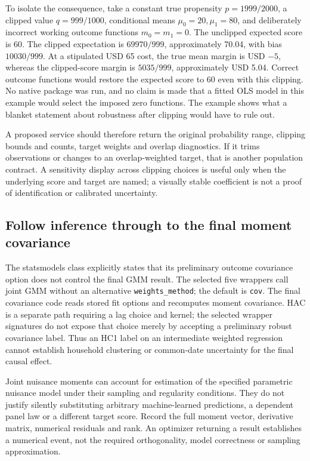 To isolate the consequence, take a constant true propensity
$p=1999/2000$, a clipped value $q=999/1000$, conditional means
$\mu_0=20,\mu_1=80$, and deliberately incorrect working outcome functions
$m_0=m_1=0$. The unclipped expected score is 60. The clipped expectation
is $69970/999$, approximately 70.04, with bias $10030/999$.
At a stipulated USD 65 cost, the true mean margin is USD $-5$, whereas
the clipped-score margin is $5035/999$, approximately USD 5.04. Correct
outcome functions would restore the expected score to 60 even with this
clipping. No native package was run, and no claim is made that a fitted
OLS model in this example would select the imposed zero functions.
The example shows what a blanket statement about robustness after clipping
would have to rule out.~\citep{exec20_python_effect_reference}

A proposed service should therefore return the original probability range,
clipping bounds and counts, target weights and overlap diagnostics. If it
trims observations or changes to an overlap-weighted target, that is another
population contract. A sensitivity display across clipping choices is useful
only when the underlying score and target are named; a visually stable
coefficient is not a proof of identification or calibrated uncertainty.

\subsection{Follow inference through to the final moment covariance}
\label{exec20:pyfx-covariance}
The statsmodels class explicitly states that its preliminary outcome
covariance option does not control the final GMM result. The selected five
wrappers call joint GMM without an alternative \texttt{weights\_method};
the default is \texttt{cov}. The final covariance code reads stored fit
options and recomputes moment covariance. HAC is a separate path requiring
a lag choice and kernel; the selected wrapper signatures do not expose that
choice merely by accepting a preliminary robust covariance label.
Thus an HC1 label on an intermediate weighted regression cannot establish
household clustering or common-date uncertainty for the final causal effect.
\citep{exec20_python_effect_source,v131_sw_statsmodels}

Joint nuisance moments can account for estimation of the specified
parametric nuisance model under their sampling and regularity conditions.
They do not justify silently substituting arbitrary machine-learned
predictions, a dependent panel law or a different target score. Record the
full moment vector, derivative matrix, numerical residuals and rank. An
optimizer returning a result establishes a numerical event, not the required
orthogonality, model correctness or sampling approximation.

